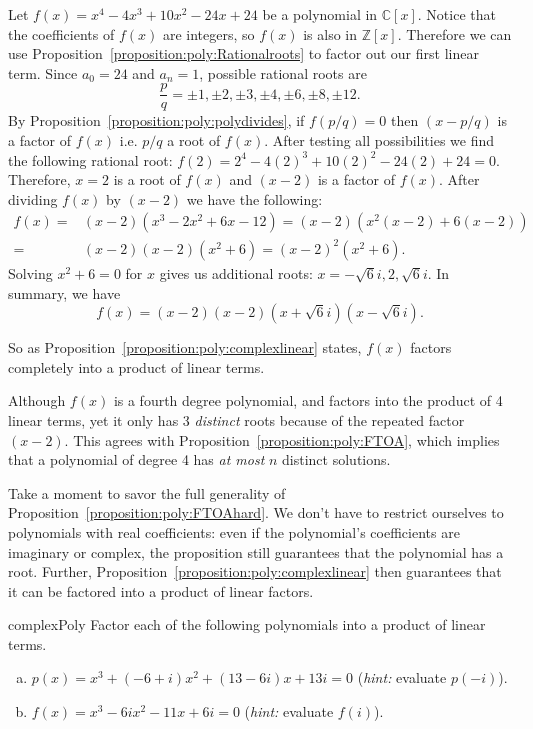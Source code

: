 \begin{example}{}
Let $f(x)=x^4-4x^3+10x^2-24x+24$ be a polynomial in $\mathbb{C}[x]$. Notice that the coefficients of $f(x)$ are integers, so $f(x)$ is also in $\mathbb{Z}[x]$. Therefore we can use Proposition~\ref{proposition:poly:Rationalroots} to factor out our first linear term. Since $a_0=24$ and $a_n=1$, possible rational roots are 
$$\frac{p}{q}= \pm1, \pm 2, \pm 3, \pm 4,\pm 6, \pm 8, \pm 12.$$ 
By Proposition~\ref{proposition:poly:polydivides}, if $f(p/q)=0$ then $(x-p/q)$ is a factor of $f(x)$ i.e. $p/q$ a root of $f(x)$. After testing all possibilities we find the following rational root:
$f(2)=2^4-4(2)^3+10(2)^2-24(2)+24=0$. Therefore, $x=2$ is a root of $f(x)$ and $(x-2)$ is a factor of $f(x)$. After dividing $f(x)$ by $(x-2)$ we have the following: 
\begin{align*}
f(x)=& (x-2)(x^3-2x^2+6x-12)=(x-2)(x^2(x-2)+6(x-2))\\
=&(x-2)(x-2)(x^2+6)=(x-2)^2(x^2+6). 
\end{align*}
Solving $x^2+6=0$  for $x$ gives us additional roots: $x = -\sqrt6 i, 2,\sqrt6 i$. In summary, we have
$$f(x)= (x-2)(x-2)(x+\sqrt{6}i)(x-\sqrt{6}i).$$ 

So as Proposition~\ref{proposition:poly:complexlinear} states, $f(x)$  factors completely into a product of  linear terms. 
\end{example}

\begin{rem}
Although $f(x)$ is a fourth degree polynomial, and factors into the product of 4 linear terms, yet it only has 3 \emph{distinct} roots because of the repeated factor $(x-2)$. This agrees with  Proposition~\ref{proposition:poly:FTOA}, which implies that a polynomial of degree 4 has \emph{at most} $n$ distinct solutions.  
\end{rem}

Take a moment to savor the full generality of Proposition~\ref{proposition:poly:FTOAhard}. We don't have to restrict ourselves to polynomials with real coefficients: even if the polynomial's coefficients are imaginary or complex, the proposition still guarantees that the polynomial has a root. Further, Proposition~\ref{proposition:poly:complexlinear} then guarantees that it can be factored into a product of linear factors.

\begin{exercise}{complexPoly}
Factor each of the following polynomials into a product of linear terms.
\begin{enumerate}[(a)]
\item
$p(x) = x^3 + (-6+i)x^2 + (13-6i)x + 13i = 0$  (\emph{hint:} evaluate $p(-i)$).
\item
$f(x) = x^3 - 6ix^2 -11x + 6i = 0$ (\emph{hint:} evaluate $f(i)$).
\end{enumerate}
\end{exercise}

